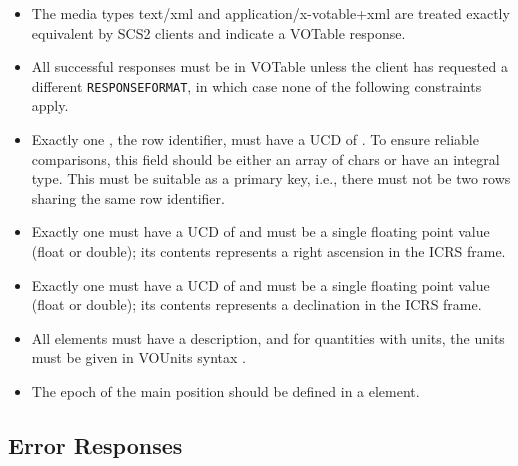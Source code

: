 \documentclass[11pt,a4paper]{ivoa}
\begin{document}
\begin{itemize}
\item The media types text/xml and application/x-votable+xml are treated
exactly equivalent by SCS2 clients and indicate a VOTable response.

\item All successful responses must be in VOTable unless the
client has requested a different \verb|RESPONSEFORMAT|,
in which case none of the following constraints apply.

\item Exactly one , the row identifier, must have a UCD of
.  To ensure reliable comparisons, this field
should be either an array of chars or have an integral type.
This
must be suitable as a primary key, i.e., there must not be two rows
sharing the same row identifier.

\item Exactly one  must have a UCD of
 and must be a single floating point value
(float or double); its contents represents a right ascension in the ICRS
frame.

\item Exactly one  must have a UCD of
 and must be a single floating point value
(float or double); its contents represents a declination in the ICRS
frame.

\item All  elements must have a description, and for
quantities with units, the units must be given in VOUnits syntax
\citep{2014ivoa.spec.0523D}.

\item The epoch of the main position should be defined in a
 element.
\end{itemize}

\subsection{Error Responses}
\end{document}
